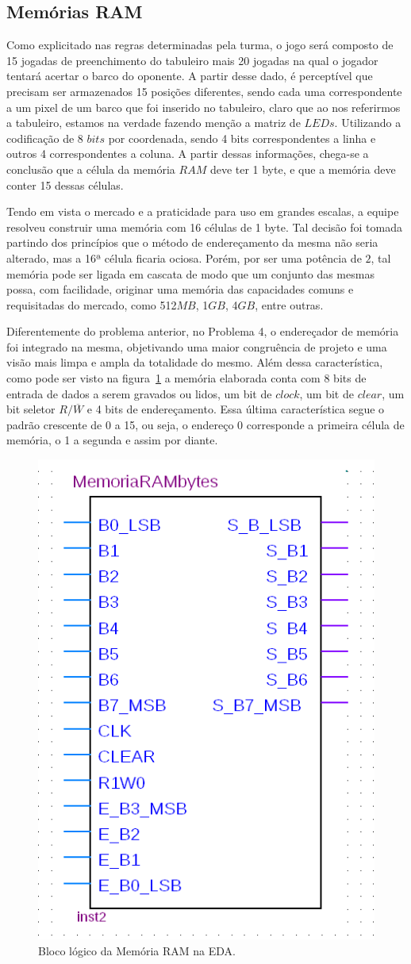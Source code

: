\documentclass[12pt]{article}
\begin{document}
\subsection{Memórias RAM}
Como explicitado nas regras determinadas pela turma, o jogo será composto de 15 jogadas de preenchimento do tabuleiro mais 20 jogadas na qual o jogador tentará acertar o barco do oponente. A partir desse dado, é perceptível que precisam ser armazenados 15 posições diferentes, sendo cada uma correspondente a um pixel de um barco que foi inserido no tabuleiro, claro que ao nos referirmos a tabuleiro, estamos na verdade fazendo menção a matriz de $LEDs$. Utilizando a codificação de 8 $bits$ por coordenada, sendo 4 bits correspondentes a linha e outros 4 correspondentes a coluna. A partir dessas informações, chega-se a conclusão que a célula da memória $RAM$ deve ter 1 byte, e que a memória deve conter 15 dessas células.

Tendo em vista o mercado e a praticidade para uso em grandes escalas, a equipe resolveu construir uma memória com 16 células de 1 byte. Tal decisão foi tomada partindo dos princípios que o método de endereçamento da mesma não seria alterado, mas a 16ª célula ficaria ociosa. Porém, por ser uma potência de $2$, tal memória pode ser ligada em cascata de modo que um conjunto das mesmas possa, com facilidade, originar uma memória das capacidades comuns e requisitadas do mercado, como 512$MB$, 1$GB$, 4$GB$, entre outras.

Diferentemente do problema anterior, no Problema 4, o endereçador de memória foi integrado na mesma, objetivando uma maior congruência de projeto e uma visão mais limpa e ampla da totalidade do mesmo. Além dessa característica, como pode ser visto na figura~\ref{fig:ram15} a memória elaborada conta com 8 bits de entrada de dados a serem gravados ou lidos, um bit de $clock$, um bit de $clear$, um bit seletor $R/\overline{W}$ e 4 bits de endereçamento. Essa última característica segue o padrão crescente de 0 a 15, ou seja, o endereço 0 corresponde a primeira célula de memória, o 1 a segunda e assim por diante.


\begin{figure}[h]
\centering
\includegraphics[width=.3\textwidth]{img/ram15bytes.png}
\caption{Bloco lógico da Memória RAM na EDA.}
\label{fig:ram15}
\end{figure}
\end{document}
